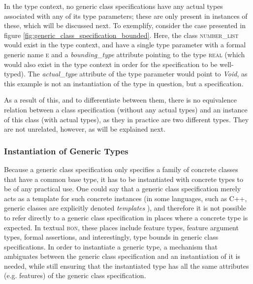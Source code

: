 In the type context, no generic class specifications have any actual types associated with any of its type parameters; these are only present in instances of these, which will be discussed next. To exemplify, consider the case presented in figure \ref{fig:generic_class_specification_bounded}. Here, the class \textsc{number\_list} would exist in the type context, and have a single type parameter with a formal generic name \textsc{e} and a \textit{bounding\_type} attribute pointing to the type \textsc{real} (which would also exist in the type context in order for the specification to be well-typed). The \textit{actual\_type} attribute of the type parameter would point to \textit{Void}, as this example is not an instantiation of the type in question, but a specification.

As a result of this, and to differentiate between them, there is no equivalence relation between a class specification (without any actual types) and an instance of this class (with actual types), as they in practice are two different types. They are not unrelated, however, as will be explained next.
\subsubsection{Instantiation of Generic Types}
Because a generic class specification only specifies a family of concrete classes that have a common base type,  it has to be instantiated with concrete types to be of any practical use.  One could say that a generic class specification merely acts as a template for such concrete instances (in some languages, such as C++, generic classes are explicitly denoted \textit{templates} \cite{stroustrup1997}), and therefore it is not possible to refer directly to a generic class specification in places where a concrete type is expected. In textual \textsc{bon}, these places include feature types, feature argument types, formal assertions, and interestingly, type bounds in generic class specifications. In order to instantiate a generic type, a mechanism that ambiguates between the generic class specification and an instantiation of it is needed, while still ensuring that the instantiated type has all the same attributes (e.g. features) of the generic class specification.
